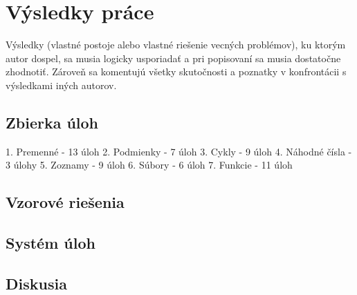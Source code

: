 \chapter{Výsledky práce}
Výsledky (vlastné postoje alebo vlastné riešenie vecných problémov), ku ktorým autor dospel, sa musia logicky usporiadať a pri popisovaní sa musia dostatočne zhodnotiť. Zároveň sa komentujú všetky skutočnosti a poznatky v konfrontácii s výsledkami iných autorov. 

\section{Zbierka úloh}

1. Premenné - 13 úloh
2. Podmienky - 7 úloh
3. Cykly - 9 úloh
4. Náhodné čísla - 3 úlohy
5. Zoznamy - 9 úloh
6. Súbory - 6 úloh
7. Funkcie - 11 úloh


















\section{Vzorové riešenia}

\section{Systém úloh}

\section{Diskusia} 

 
